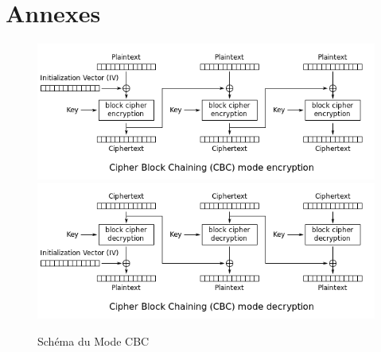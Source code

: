 \documentclass[a4paper,openany]{memoir}
\begin{document}
\part*{Annexes}
\appendix

\begin{figure}[h]
\label{fig:cbc}
\includegraphics[scale=0.5]{CBC_Encrypt}\\
\includegraphics[scale=0.5]{CBC_Decrypt}
\caption{Schéma du Mode CBC}
\end{figure}

\clearpage

\listoffigures 

\backmatter%

\nocite{*}



\printindex
\end{document}
